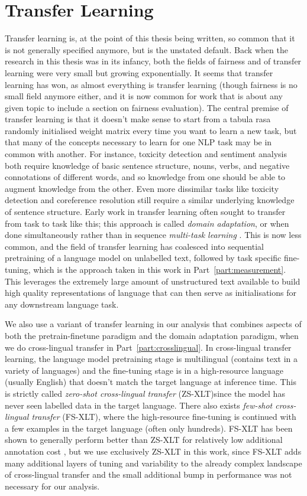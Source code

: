 \section{Transfer Learning}
Transfer learning is, at the point of this thesis being written, so common that it is not generally specified anymore, but is the unstated default. Back when the research in this thesis was in its infancy, both the fields of fairness and of transfer learning were very small but growing exponentially. It seems that transfer learning has won, as almost everything is transfer learning (though fairness is no small field anymore either, and it is now common for work that is about any given topic to include a section on fairness evaluation). 
The central premise of transfer learning is that it doesn't make sense to start from a tabula rasa randomly initialised weight matrix every time you want to learn a new task, but that many of the concepts necessary to learn for one NLP task may be in common with another. For instance, toxicity detection and sentiment analysis both require knowledge of basic sentence structure, nouns, verbs, and negative connotations of different words, and so knowledge from one should be able to augment knowledge from the other. Even more dissimilar tasks like toxicity detection and coreference resolution still require a similar underlying knowledge of sentence structure. Early work in transfer learning often sought to transfer from task to task like this; this approach is called \textit{domain adaptation}, or when done simultaneously rather than in sequence \textit{multi-task learning} \citep{ruder2019transfer}. This is now less common, and the field of transfer learning has coalesced into sequential pretraining of a language model on unlabelled text, followed by task specific fine-tuning, which is the approach taken in this work in Part~\ref{part:measurement}. This leverages the extremely large amount of unstructured text available to build high quality representations of language that can then serve as initialisations for any downstream language task. 

We also use a variant of transfer learning in our analysis that combines aspects of both the pretrain-finetune paradigm and the domain adaptation paradigm, when we do cross-lingual transfer in Part~\ref{part:crosslingual}. In cross-lingual transfer learning, the language model pretraining stage is multilingual (contains text in a variety of languages) and the fine-tuning stage is in a high-resource language (usually English) that doesn't match the target language at inference time. This is strictly called \textit{zero-shot cross-lingual transfer} (ZS-XLT)since the model has never seen labelled data in the target language. There also exists \textit{few-shot cross-lingual transfer} (FS-XLT), where the high-resource fine-tuning is continued with a few examples in the target language (often only hundreds). FS-XLT has been shown to generally perform better than ZS-XLT for relatively low additional annotation cost \citep{}, but we use exclusively ZS-XLT in this work, since FS-XLT adds many additional layers of tuning and variability to the already complex landscape of cross-lingual transfer and the small additional bump in performance was not necessary for our analysis.


